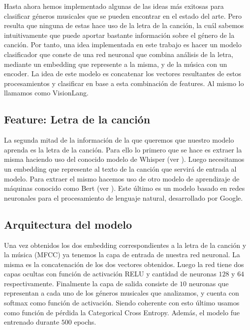 \documentclass[colorinlistoftodos,twoside,twocolumn,10pt]{article} %
\begin{document}
Hasta ahora hemos implementado algunas de las ideas m\'as exitosas para clasificar g\'eneros musicales que se pueden encontrar en el estado del arte. Pero resulta que ninguna de estas hace uso de la letra de la canci\'on, la cu\'al sabemos intuitivamente que puede aportar bastante informaci\'on sobre el g\'enero de la canci\'on. Por tanto, una idea implementada en este trabajo es hacer un modelo clasificador que conste de una red neuronal que combina an\'alisis de la letra, mediante un embedding que represente a la misma, y de la m\'usica con un encoder. La idea de este modelo es concatenar los vectores resultantes de estos procesamientos y clasificar en base a esta combinaci\'on de features. Al mismo lo llamamos como VisionLang.

\subsection{Feature: Letra de la canci\'on}

La segunda mitad de la informaci\'on de la que queremos que nuestro modelo aprenda es la letra de la canci\'on. Para ello lo primero que se hace es extraer la misma haciendo uso del conocido modelo de Whisper (ver \cite{whisper}). Luego necesitamos un embedding que represente al texto de la canci\'on que servir\'a de entrada al modelo. Para extraer el mismo hacemos uso de otro modelo de aprendizaje de m\'aquinas conocido como Bert (ver \cite{bert}). Este \'ultimo es un modelo basado en redes neuronales para el procesamiento de lenguaje natural, desarrollado por Google.

\subsection{Arquitectura del modelo}

Una vez obtenidos los dos embedding correspondientes a la letra de la canci\'on y la m\'usica (MFCC) ya tenemos la capa de entrada de nuestra red neuronal. La misma es la concatenaci\'on de los dos vectores obtenidos. Luego la red tiene  dos capas ocultas con funci\'on de activaci\'on RELU y cantidad de neuronas $128$ y $64$ respectivamente. Finalmente la capa de salida consiste de $10$ neuronas que representan a cada uno de los g\'eneros musicales que analizamos, y cuenta con softmax como funci\'on de activaci\'on. Siendo coherente con esto \'ultimo usamos como funci\'on de p\'erdida la Categorical Cross Entropy. Adem\'as, el modelo fue entrenado durante $500$ epochs.
\end{document}
